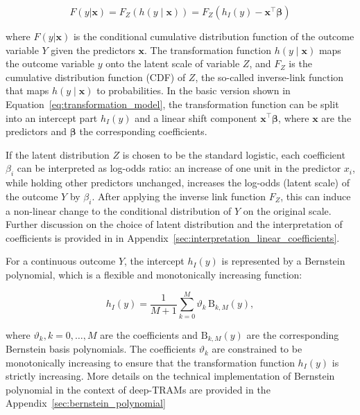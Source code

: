 \begin{equation}
F(y|\mathbf{x}) = F_Z(h(y \mid \mathbf{x})) =  F_Z(h_I(y) - \mathbf{x}^\top \boldsymbol{\beta})
\label{eq:transformation_model}
\end{equation}

where $F(y|\mathbf{x})$ is the conditional cumulative distribution function of the outcome variable $Y$ given the predictors $\mathbf{x}$. The transformation function $h(y \mid \mathbf{x})$ maps the outcome variable $y$ onto the latent scale of variable $Z$, and $F_Z$ is the cumulative distribution function (CDF) of $Z$, the so-called inverse-link function that maps $h(y \mid \mathbf{x})$ to probabilities. In the basic version shown in Equation~\ref{eq:transformation_model}, the transformation function can be split into an intercept part $h_I(y)$ and a linear shift component $\mathbf{x}^\top \boldsymbol{\beta}$, where $\mathbf{x}$ are the predictors and $\boldsymbol{\beta}$ the corresponding coefficients.

If the latent distribution $Z$ is chosen to be the standard logistic, each coefficient $\beta_i$ can be interpreted as log-odds ratio: an increase of one unit in the predictor $x_i$, while holding other predictors unchanged, increases the log-odds (latent scale) of the outcome $Y$ by $\beta_i$. After applying the inverse link function $F_Z$, this can induce a non-linear change to the conditional distribution of $Y$ on the original scale. Further discussion on the choice of latent distribution and the interpretation of coefficients is provided in in Appendix~\ref{sec:interpretation_linear_coefficients}.

For a continuous outcome $Y$, the intercept $h_I(y)$ is represented by a Bernstein polynomial, which is a flexible and monotonically increasing function:

\begin{equation}
h_I(y) = \frac{1}{M + 1} \sum_{k=0}^{M} \vartheta_k \, \text{B}_{k, M}(y),
\label{eq:methods_bernstein_polynomial}
\end{equation}

where $\vartheta_k, k = 0, \ldots, M$ are the coefficients and $\text{B}_{k, M}(y)$ are the corresponding Bernstein basis polynomials. The coefficients $\vartheta_k$ are constrained to be monotonically increasing to ensure that the transformation function $h_I(y)$ is strictly increasing. More details on the technical implementation of Bernstein polynomial in the context of deep-TRAMs are provided in the Appendix~\ref{sec:bernstein_polynomial}






